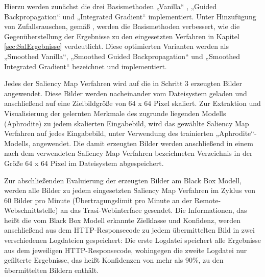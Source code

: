 Hierzu werden zunächst die drei Basismethoden „Vanilla“ \cite{simonyan_deep_2013}, „Guided Backpropagation“ \cite{springenberg_striving_2014} und „Integrated Gradient“ \cite{sundararajan_axiomatic_2017} implementiert. 
Unter Hinzufügung von Zufallsrauschen, gemäß \cite{smilkov_smoothgrad:_2017}, werden die Basismethoden verbessert, wie die Gegenüberstellung der Ergebnisse zu den eingesetzten Verfahren in Kapitel \ref{sec:SalErgebnisse} verdeutlicht.
Diese optimierten Varianten werden als „Smoothed Vanilla“, „Smoothed Guided Backpropagation“ und „Smoothed Integrated Gradient“ bezeichnet und implementiert.


Jedes der Saliency Map Verfahren wird auf die in Schritt 3 erzeugten Bilder angewendet. Diese Bilder werden nacheinander vom Dateisystem geladen und anschließend auf eine Zielbildgröße von 64 x 64 Pixel skaliert. 
Zur Extraktion und Visualisierung der gelernten Merkmale des zugrunde liegenden Modells (Aphrodite) zu jedem skalierten Eingabebild, wird das gewählte Saliency Map Verfahren auf jedes Eingabebild, unter Verwendung des trainierten „Aphrodite“-Modells, angewendet. 
Die damit erzeugten Bilder werden anschließend in einem nach dem verwendeten Saliency Map Verfahren bezeichneten Verzeichnis in der Größe 64 x 64 Pixel im Dateisystem abgespeichert.


Zur abschließenden Evaluierung der erzeugten Bilder am Black Box Modell, werden alle Bilder zu jedem eingesetzten Saliency Map Verfahren im Zyklus von 60 Bilder pro Minute (Übertragungslimit pro Minute an der Remote-Webschnittstelle) an das Trasi-Webinterface gesendet. Die Informationen, das heißt die vom Black Box Modell erkannte Zielklasse und Konfidenz, werden anschließend aus dem HTTP-Responsecode zu jedem übermittelten Bild in zwei verschiedenen Logdateien gespeichert: Die erste Logdatei speichert alle Ergebnisse aus dem jeweiligen HTTP-Responsecode, wohingegen die zweite Logdatei nur gefilterte Ergebnisse, das heißt Konfidenzen von mehr als 90\%, zu den übermittelten Bildern enthält.


%
%
%
%
%

